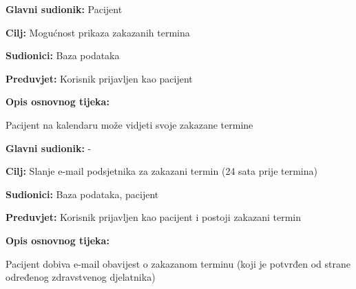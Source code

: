 \noindent {}
\begin{packed_item}
	
	\item \textbf{Glavni sudionik: }Pacijent
	\item  \textbf{Cilj:} Mogućnost prikaza zakazanih termina
	\item  \textbf{Sudionici:} Baza podataka
	\item  \textbf{Preduvjet:} Korisnik prijavljen kao pacijent
	\item  \textbf{Opis osnovnog tijeka:}
	
	\item[] \begin{packed_enum}
		
		\item Pacijent na kalendaru može vidjeti svoje zakazane termine
	\end{packed_enum}
\end{packed_item}


\noindent {}
\begin{packed_item}
	
	\item \textbf{Glavni sudionik: }-
	\item  \textbf{Cilj:} Slanje e-mail podsjetnika za zakazani termin (24 sata prije termina)
	\item  \textbf{Sudionici:} Baza podataka, pacijent
	\item  \textbf{Preduvjet:} Korisnik prijavljen kao pacijent i postoji zakazani termin
	\item  \textbf{Opis osnovnog tijeka:}
	
	\item[] \begin{packed_enum}
		
		\item Pacijent dobiva e-mail obavijest o zakazanom terminu (koji je potvrđen od strane određenog zdravstvenog djelatnika)
	\end{packed_enum}
\end{packed_item}

